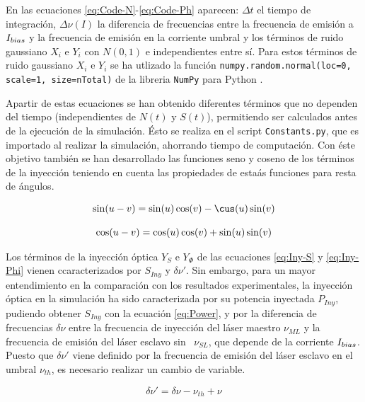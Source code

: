 En las ecuaciones \ref{eq:Code-N}-\ref{eq:Code-Ph} aparecen: $\Delta t$ el tiempo de integraci\'on, $\Delta\nu(I)$ la diferencia de frecuencias entre la frecuencia de emisi\'on a $I_{bias}$ y la frecuencia de emisi\'on en la corriente umbral \cite{Chaves19} y los t\'erminos de ruido gaussiano $X_i$ e $Y_i$ con $N(0, 1)$ e independientes entre s\'i. Para estos t\'erminos de ruido gaussiano $X_i$ e $Y_i$ se ha utlizado la funci\'on \texttt{numpy.random.normal(loc=0, scale=1, size=nTotal)} de la libreria \texttt{NumPy} para Python \cite{numpy}.

Apartir de estas ecuaciones se han obtenido diferentes t\'erminos que no dependen del tiempo (independientes de $N(t)$ y $S(t)$), permitiendo ser calculados antes de la ejecuci\'on de la simulaci\'on. \'Esto se realiza en el script \texttt{Constants.py}, que es importado al realizar la simulaci\'on, ahorrando tiempo de computaci\'on. Con \'este objetivo tambi\'en se han desarrollado las funciones seno y coseno de los t\'erminos de la inyecci\'on teniendo en cuenta las propiedades de esta\'as funciones para resta de \'angulos.

	\begin{equation}
		\begin{matrix}
			\sin(u - v) = \sin(u)\cos(v) - \cus(u)\sin(v) \\ \\

			\cos(u - v) = \cos(u)\cos(v) + \sin(u)\sin(v) 
		\end{matrix}
	\end{equation}

	Los t\'erminos de la inyecci\'on \'optica $Y_S$ e $Y_{\Phi}$ de las ecuaciones \ref{eq:Iny-S} y \ref{eq:Iny-Phi} vienen ccaracterizados por $S_{Iny}$ y $\delta\nu'$. Sin embargo, para un mayor entendimiento en la comparaci\'on con los resultados experimentales, la inyecci\'on \'optica en la simulaci\'on ha sido caracterizada por su potencia inyectada $P_{Iny}$, pudiendo obtener $S_{Iny}$ con la ecuaci\'on \ref{eq:Power}, y por la diferencia de frecuencias $\delta\nu$ entre la frecuencia de inyecci\'on del l\'aser maestro $\nu_{ML}$ y la frecuencia de emisi\'on del l\'aser esclavo sin \gs\ $\nu_{SL}$, que depende de la corriente $I_{bias}$. Puesto que $\delta\nu'$ viene definido por la frecuencia de emisi\'on del l\'aser esclavo en el umbral $\nu_{th}$, es necesario realizar un cambio de variable.

	\begin{equation}
		\delta\nu' = \delta\nu - \nu_{th} + \nu
	\end{equation}

